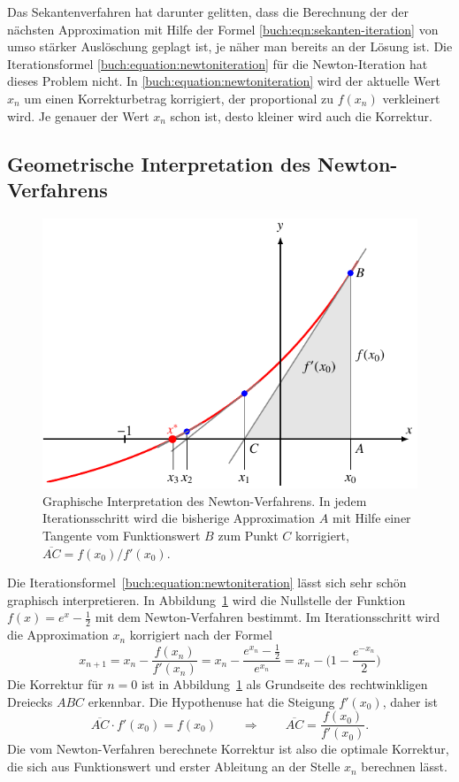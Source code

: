 Das Sekantenverfahren hat darunter gelitten, dass die Berechnung
der der nächsten Approximation mit Hilfe der Formel 
\eqref{buch:eqn:sekanten-iteration} von umso stärker Auslöschung
geplagt ist, je näher man bereits an der Lösung ist.
Die Iterationsformel
\eqref{buch:equation:newtoniteration}
für die Newton-Iteration hat dieses Problem nicht.
In \eqref{buch:equation:newtoniteration} wird der aktuelle Wert $x_n$
um einen Korrekturbetrag korrigiert, der proportional zu $f(x_n)$
verkleinert wird.
Je genauer der Wert $x_n$ schon ist, desto kleiner wird auch die
Korrektur.

%
%
\subsection{Geometrische Interpretation des Newton-Verfahrens}
\begin{figure}
\centering
\includegraphics{chapters/20-gleichungen/figures/newton.pdf}
\caption{Graphische Interpretation des Newton-Verfahrens.
In jedem Iterationsschritt wird die bisherige Approximation $A$
mit Hilfe einer Tangente vom Funktionswert $B$ zum Punkt $C$
korrigiert, $\overline{AC}=f(x_0)/f'(x_0)$.
\label{buch:figure:newton}}
\end{figure}
Die Iterationsformel~\eqref{buch:equation:newtoniteration}
lässt sich sehr schön graphisch interpretieren.
In Abbildung~\ref{buch:figure:newton} wird die Nullstelle der
Funktion $f(x) = e^x-\frac12$ mit dem Newton-Verfahren bestimmt.
Im Iterationsschritt wird die Approximation $x_n$ korrigiert
nach der Formel
\[
x_{n+1}
=
x_n - \frac{f(x_n)}{f'(x_n)}
=
x_n - \frac{e^{x_n}-\frac12}{e^{x_n}}
=
x_n - \biggl(1 -\frac{e^{-x_n}}{2}\biggr)
\]
Die Korrektur für $n=0$ ist in Abbildung~\ref{buch:figure:newton}
als Grundseite des rechtwinkligen Dreiecks $ABC$ erkennbar.
Die Hypothenuse hat die Steigung $f'(x_0)$, daher ist
\[
\overline{AC}\cdot f'(x_0) = f(x_0)
\qquad\Rightarrow\qquad
\overline{AC} = \frac{f(x_0)}{f'(x_0)}.
\]
Die vom Newton-Verfahren berechnete Korrektur ist also die optimale
Korrektur, die sich aus Funktionswert und erster Ableitung
an der Stelle $x_n$ berechnen lässt.

